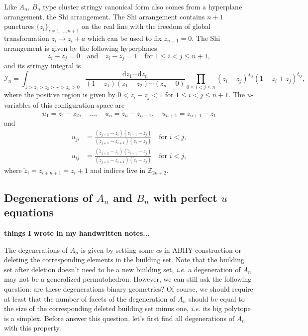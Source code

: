 \documentclass[hidelinks,12pt]{article}
\begin{document}
Like $A_n$, $B_n$ type cluster stringy canonical form also comes from a hyperplane 
arrangement, the Shi arrangement. The Shi arrangement contains $n+1$ punctures 
$\{z_i\}_{i=1,\dots,n+1}$ on the real line with the freedom of global transformation 
$z_i\to z_i+a$ which can be used to fix $z_{n+1}=0$. The Shi arrangement is 
given by the following hyperplanes
\[
	z_i-z_j=0\quad \text{and}\quad z_i-z_j=1\quad \text{for $1\leq i<j\leq n+1$},
\]
and its stringy integral is 
\[
\mathcal I_n = \int_{1>z_1>z_2>\cdots >z_n>0}
\frac{\mathrm dz_1\cdots \mathrm dz_{n}}{(1-z_1)(z_1-z_2)\cdots (z_{n}-0)}
\prod_{0\leq i<j \leq n}(z_i-z_j)^{s_{ij}}(1-z_i+z_j)^{t_{ij}},
\]
where the positive region is given by $0<z_i-z_j<1$ for $1\leq i<j \leq n+1$.
The $u$-variables of this configuration space are
\[
    u_1=\tilde z_1-z_2,\quad \dots,\quad u_{n}=\tilde z_{n}-z_{n+1},
    \quad u_{n+1}=z_{n+1}-z_1
\]
and 
\begin{align*}
    u_{ji}&=\frac{(z_{j+1}-z_{i})(z_{i+1}-z_j)}{(z_{j+1}-z_{i+1})(z_i-z_j)}\quad \text{for $i<j$},\\
    u_{ij}&=\frac{(\tilde z_{j+1}-z_{i})(\tilde z_{i+1}-z_j)}{(\tilde z_{j+1}-z_{i+1})(\tilde z_i-z_j)}\quad \text{for $i<j$},
\end{align*}
where $\tilde{z}_i=z_{i+n+1}=z_{i}+1$ and indices live in $\mathbb Z_{2n+2}$.

\subsection{Degenerations of $A_n$ and $B_n$ with perfect $u$ equations} 

{\bf things I wrote in my handwritten notes...}

The degenerations of $A_n$ is given by setting some $c$s in ABHY construction or deleting the corresponding elements in the building set. Note that the building set after deletion doesn't need to be a new building set, \emph{i.e.} a degeneration of $A_n$ may not be a generalized permutohedron. However, we can still ask the following question: are these degenerations binary geometries? 
Of course, we should require at least that the number of facets of the degeneration of $A_n$ should be equal to the size of the corresponding deleted building set minus one, \emph{i.e.} its big polytope is a simplex.
Before answer this question, let's first find all degenerations of $A_n$ with this property.
\end{document}
